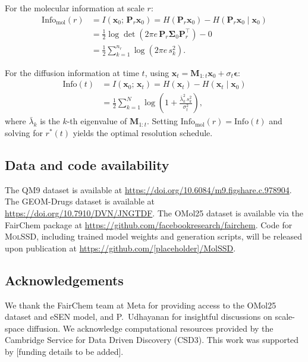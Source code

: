 \documentclass[11pt]{article}
\newcommand{\molssd}{\textsc{MolSSD}}
\newcommand{\vx}{\mathbf{x}}
\newcommand{\ve}{\boldsymbol{\epsilon}}
\newcommand{\mM}{\mathbf{M}}
\newcommand{\mP}{\mathbf{P}}
\newcommand{\info}{\mathrm{Info}}
\begin{document}
For the molecular information at scale $r$:
\begin{align}
    \info_{\text{mol}}(r) &= I(\vx_0;\, \mP_r\vx_0) = H(\mP_r\vx_0) - H(\mP_r\vx_0 \mid \vx_0) \\
    &= \frac{1}{2}\log\det(2\pi e\,\mP_r\boldsymbol{\Sigma}_0\mP_r^\top) - 0 \\
    &= \frac{1}{2}\sum_{k=1}^{n_r}\log(2\pi e\,s_k^2).
\end{align}

For the diffusion information at time $t$, using $\vx_t = \mM_{1:t}\vx_0 + \sigma_t\ve$:
\begin{align}
    \info(t) &= I(\vx_0;\,\vx_t) = H(\vx_t) - H(\vx_t \mid \vx_0) \\
    &= \frac{1}{2}\sum_{k=1}^{N}\log\!\left(1 + \frac{\bar{\lambda}_k^2\,s_k^2}{\sigma_t^2}\right),
\end{align}
where $\bar{\lambda}_k$ is the $k$-th eigenvalue of $\mM_{1:t}$. Setting $\info_{\text{mol}}(r) = \info(t)$ and solving for $r^*(t)$ yields the optimal resolution schedule.


\subsection*{Data and code availability}

The QM9 dataset is available at \url{https://doi.org/10.6084/m9.figshare.c.978904}. The GEOM-Drugs dataset is available at \url{https://doi.org/10.7910/DVN/JNGTDF}. The OMol25 dataset is available via the FairChem package at \url{https://github.com/facebookresearch/fairchem}. Code for \molssd{}, including trained model weights and generation scripts, will be released upon publication at \url{https://github.com/[placeholder]/MolSSD}.


\subsection*{Acknowledgements}

We thank the FairChem team at Meta for providing access to the OMol25 dataset and eSEN model, and P.~Udhayanan for insightful discussions on scale-space diffusion. We acknowledge computational resources provided by the Cambridge Service for Data Driven Discovery (CSD3). This work was supported by [funding details to be added].




\end{document}
